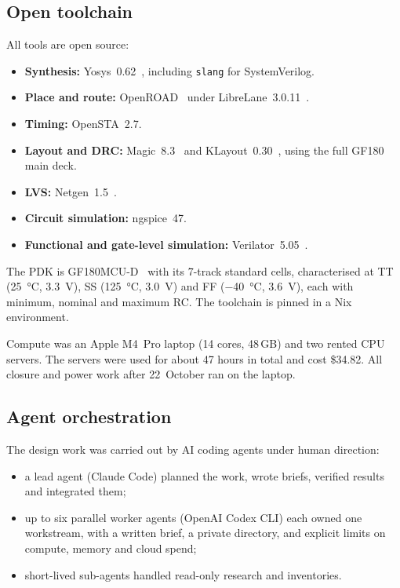 \subsection{Open toolchain}
All tools are open source:
\begin{itemize}
\item \textbf{Synthesis:} Yosys~0.62~\cite{wolf_yosys}, including \texttt{slang} for SystemVerilog.
\item \textbf{Place and route:} OpenROAD~\cite{ajayi2019openroad} under LibreLane~3.0.11~\cite{librelane}.
\item \textbf{Timing:} OpenSTA~2.7.
\item \textbf{Layout and DRC:} Magic~8.3~\cite{edwards_magic} and KLayout~0.30~\cite{koefferlein_klayout}, using the full GF180 main deck.
\item \textbf{LVS:} Netgen~1.5~\cite{edwards_netgen}.
\item \textbf{Circuit simulation:} ngspice~47.
\item \textbf{Functional and gate-level simulation:} Verilator~5.05~\cite{snyder_verilator}.
\end{itemize}
The PDK is GF180MCU-D~\cite{google_gf180mcu} with its 7-track standard cells, characterised at TT (\SI{25}{\celsius}, \SI{3.3}{V}), SS (\SI{125}{\celsius}, \SI{3.0}{V}) and FF (\SI{-40}{\celsius}, \SI{3.6}{V}), each with minimum, nominal and maximum RC. The toolchain is pinned in a Nix environment.

Compute was an Apple M4~Pro laptop (14 cores, 48\,GB) and two rented CPU servers. The servers were used for about 47 hours in total and cost \$34.82. All closure and power work after 22~October ran on the laptop.

\subsection{Agent orchestration}
The design work was carried out by AI coding agents under human direction:
\begin{itemize}
\item a lead agent (Claude Code) planned the work, wrote briefs, verified results and integrated them;
\item up to six parallel worker agents (OpenAI Codex CLI) each owned one workstream, with a written brief, a private directory, and explicit limits on compute, memory and cloud spend;
\item short-lived sub-agents handled read-only research and inventories.
\end{itemize}

